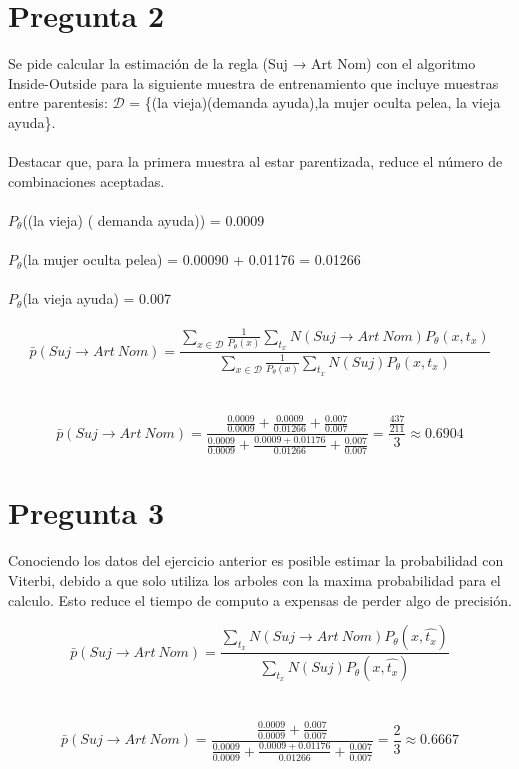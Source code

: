 \documentclass[12pt]{article}
\begin{document}
\section*{Pregunta 2}
Se pide calcular la estimación de la regla (Suj → Art Nom) con el algoritmo Inside-Outside para la siguiente muestra de entrenamiento que incluye muestras entre parentesis: $\mathcal{D}$ = \{(la vieja)(demanda ayuda),la mujer oculta pelea, la vieja ayuda\}.
\\\\
Destacar que, para la primera muestra al estar parentizada, reduce el número de combinaciones aceptadas.
\\\\
$P_\theta$((la vieja) ( demanda ayuda)) = 0.0009 \\\\
$P_\theta$(la mujer oculta pelea) = 0.00090 + 0.01176 = 0.01266 \\\\
$P_\theta$(la vieja ayuda) = 0.007
\\\\
\begin{equation*}
    \bar{p}(Suj \rightarrow Art ~ Nom) = \frac
    {
        \sum_{x \in \mathcal{D}}{\frac{1}{P_\theta(x)}}  \sum_{t_x}{ N(Suj \rightarrow Art ~ Nom) P_\theta(x, t_x)} 
    }
    {
        \sum_{x \in \mathcal{D}}{\frac{1}{P_\theta(x)}} \sum_{t_x}{ N(Suj) P_\theta(x, t_x)} 
    }
\end{equation*}
\\\\
\begin{equation*}
    \bar{p}(Suj \rightarrow Art ~ Nom) = \frac
    {
        \frac{0.0009}{0.0009} + \frac{0.0009}{0.01266} + \frac{0.007}{0.007}
    }
    {
        \frac{0.0009}{0.0009} + \frac{0.0009 + 0.01176}{0.01266} +  \frac{0.007}{0.007}
    }
    = \frac{ \frac{437}{211} }{3} \approx 0.6904
\end{equation*}

\newpage

\section*{Pregunta 3}
Conociendo los datos del ejercicio anterior es posible estimar la probabilidad con Viterbi, debido a que solo utiliza los arboles con la maxima probabilidad para el calculo. Esto reduce el tiempo de computo a expensas de perder algo de precisión.

\begin{equation*}
    \bar{p}(Suj \rightarrow Art ~ Nom) = \frac
    {
         \sum_{t_x}{ N(Suj \rightarrow Art ~ Nom) P_\theta(x, \hat{t_x})} 
    }
    {
        \sum_{t_x}{ N(Suj) P_\theta(x, \hat{t_x})} 
    }
\end{equation*}
\\\\
\begin{equation*}
    \bar{p}(Suj \rightarrow Art ~ Nom) = \frac
    {
        \frac{0.0009}{0.0009} + \frac{0.007}{0.007}
    }
    {
        \frac{0.0009}{0.0009} + \frac{0.0009 + 0.01176}{0.01266} +  \frac{0.007}{0.007}
    }
    = \frac{2}{3} \approx 0.6667
\end{equation*}
\end{document}
